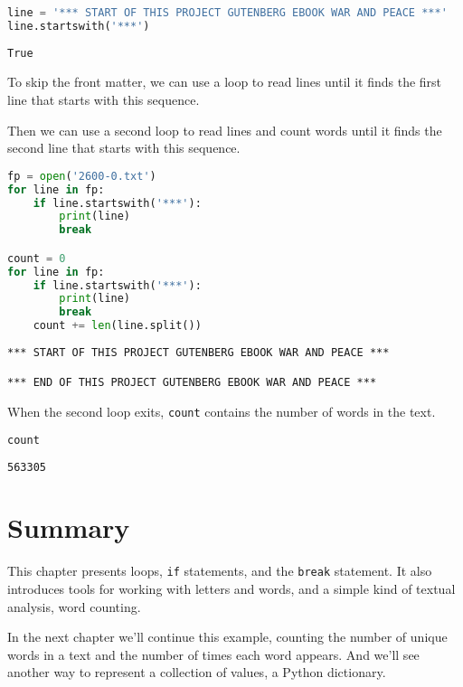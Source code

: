 \begin{lstlisting}[language=Python,style=source]
line = '*** START OF THIS PROJECT GUTENBERG EBOOK WAR AND PEACE ***'
line.startswith('***')
\end{lstlisting}

\begin{lstlisting}[style=output]
True
\end{lstlisting}

To skip the front matter, we can use a loop to read lines until it finds
the first line that starts with this sequence.

Then we can use a second loop to read lines and count words until it
finds the second line that starts with this sequence.

\begin{lstlisting}[language=Python,style=source]
fp = open('2600-0.txt')
for line in fp:
    if line.startswith('***'):
        print(line)
        break

count = 0
for line in fp:
    if line.startswith('***'):
        print(line)
        break
    count += len(line.split())
\end{lstlisting}

\begin{lstlisting}[style=output]
*** START OF THIS PROJECT GUTENBERG EBOOK WAR AND PEACE ***

*** END OF THIS PROJECT GUTENBERG EBOOK WAR AND PEACE ***
\end{lstlisting}

When the second loop exits, \passthrough{\lstinline!count!} contains the
number of words in the text.

\begin{lstlisting}[language=Python,style=source]
count
\end{lstlisting}

\begin{lstlisting}[style=output]
563305
\end{lstlisting}

\section{Summary}\label{summary}

This chapter presents loops, \passthrough{\lstinline!if!} statements,
and the \passthrough{\lstinline!break!} statement. It also introduces
tools for working with letters and words, and a simple kind of textual
analysis, word counting.

In the next chapter we'll continue this example, counting the number of
unique words in a text and the number of times each word appears. And
we'll see another way to represent a collection of values, a Python
dictionary.
